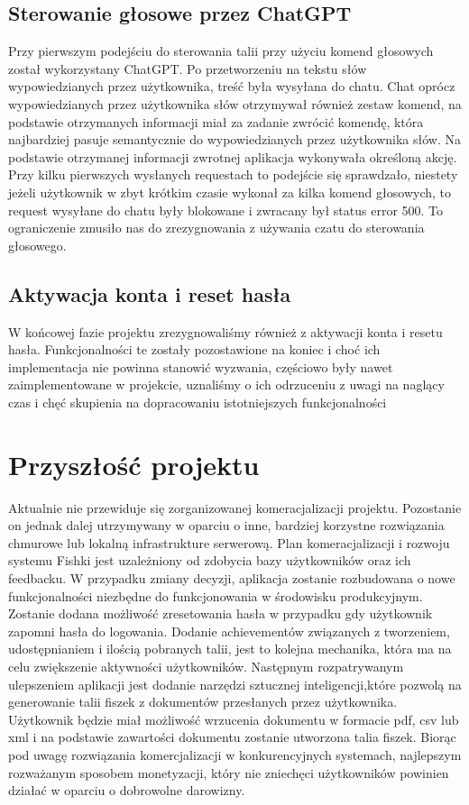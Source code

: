\subsection{Sterowanie głosowe przez ChatGPT}
Przy pierwszym podejściu do sterowania talii przy użyciu komend głosowych został wykorzystany ChatGPT. Po przetworzeniu na tekstu słów wypowiedzianych przez użytkownika, treść była wysyłana do chatu. Chat oprócz wypowiedzianych przez użytkownika słów otrzymywał również zestaw komend, na podstawie otrzymanych informacji miał za zadanie zwrócić komendę, która najbardziej pasuje semantycznie do wypowiedzianych przez użytkownika słów. Na podstawie otrzymanej informacji zwrotnej aplikacja wykonywała określoną akcję. Przy kilku pierwszych wysłanych requestach to podejście się sprawdzało, niestety jeżeli użytkownik w zbyt krótkim czasie wykonał za kilka komend głosowych, to request wysyłane do chatu były blokowane i zwracany był status error 500. To ograniczenie zmusiło nas do zrezygnowania z używania czatu do sterowania głosowego.

\subsection{Aktywacja konta i reset hasła}
W końcowej fazie projektu zrezygnowaliśmy również z aktywacji konta i resetu hasła. Funkcjonalności te zostały pozostawione na koniec i choć ich implementacja nie powinna stanowić wyzwania, częściowo były nawet zaimplementowane w projekcie,  uznaliśmy o ich odrzuceniu z uwagi na naglący czas i chęć skupienia na dopracowaniu istotniejszych funkcjonalności


\section{Przyszłość projektu}
Aktualnie nie przewiduje się zorganizowanej komeracjalizacji projektu. Pozostanie on jednak dalej utrzymywany w oparciu o inne, bardziej korzystne rozwiązania chmurowe lub lokalną infrastrukture serwerową. Plan komeracjalizacji i rozwoju systemu Fishki jest uzależniony od zdobycia bazy użytkowników oraz ich feedbacku. W przypadku zmiany decyzji, aplikacja zostanie rozbudowana o nowe funkcjonalności niezbędne do funkcjonowania w środowisku produkcyjnym. Zostanie dodana możliwość zresetowania hasła w przypadku gdy użytkownik zapomni hasła do logowania. Dodanie achievementów związanych z tworzeniem, udostępnianiem i ilością pobranych talii, jest to kolejna mechanika, która ma na celu zwiększenie aktywności użytkowników. Następnym rozpatrywanym ulepszeniem aplikacji jest dodanie narzędzi sztucznej inteligencji,które pozwolą na generowanie talii fiszek z dokumentów przesłanych przez użytkownika. Użytkownik będzie miał możliwość wrzucenia dokumentu w formacie pdf, csv lub xml i na podstawie zawartości dokumentu zostanie utworzona talia fiszek. Biorąc pod uwagę rozwiązania komercjalizacji w konkurencyjnych systemach, najlepszym rozważanym sposobem monetyzacji, który nie zniechęci użytkowników powinien działać w oparciu o dobrowolne darowizny.


